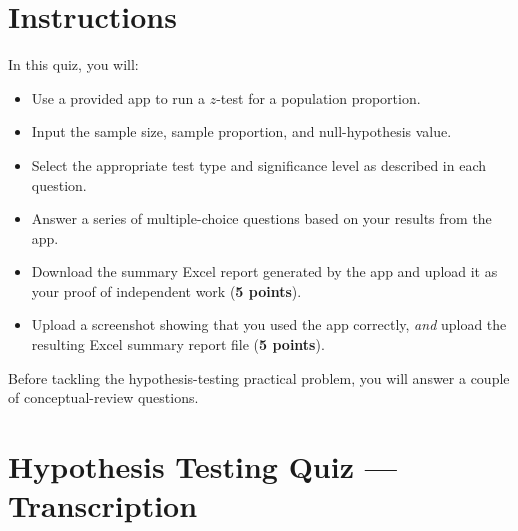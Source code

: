 \documentclass[12pt]{article}
\begin{document}
\section*{Instructions}
In this quiz, you will:
\begin{itemize}
    \item Use a provided app to run a $z$-test for a population proportion.
    \item Input the sample size, sample proportion, and null-hypothesis value.
    \item Select the appropriate test type and significance level as described in each question.
    \item Answer a series of multiple-choice questions based on your results from the app.
    \item Download the summary Excel report generated by the app and upload it as your proof of independent work (\textbf{5 points}).
    \item Upload a screenshot showing that you used the app correctly, \emph{and} upload the resulting Excel summary report file (\textbf{5 points}).
\end{itemize}

Before tackling the hypothesis-testing practical problem, you will answer a couple of conceptual-review questions.

\bigskip

\section*{Hypothesis Testing Quiz — Transcription}
\end{document}
